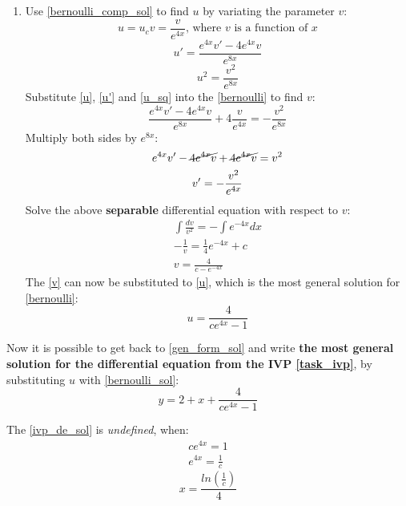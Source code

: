 \documentclass[12pt,a4paper,titlepage]{article}
\begin{document}
\begin{enumerate}
\begin{enumerate}
      \item Use \eqref{bernoulli_comp_sol} to find $u$ by variating the parameter $v$:
      \begin{equation} \label{u}
        u = u_cv = \frac{v}{e^{4x}} \text{, where $v$ is a function of $x$}
      \end{equation}
      \begin{equation} \label{u'}
        u' = \frac{e^{4x}v' - 4e^{4x}v}{e^{8x}}
      \end{equation}
      \begin{equation} \label{u_sq}
        u^2 = \frac{v^2}{e^{8x}}
      \end{equation}
      Substitute \eqref{u}, \eqref{u'} and \eqref{u_sq} into the \eqref{bernoulli} to find $v$:
      \begin{equation*}
        \frac{e^{4x}v' - 4e^{4x}v}{e^{8x}} + 4\frac{v}{e^{4x}} = -\frac{v^2}{e^{8x}}
      \end{equation*}
      Multiply both sides by $e^{8x}$:
      \begin{gather*}
        e^{4x}v' - \cancel{4e^{4x}v} + \cancel{4e^{4x}v} = v^2\\
        v' = -\frac{v^2}{e^{4x}}
      \end{gather*}
      Solve the above \textbf{separable} differential equation with respect to $v$:
      \begin{gather}
        \int \frac{dv}{v^2} = - \int e^{-4x} dx \nonumber \\
        - \frac{1}{v} = \frac{1}{4}e^{-4x} + c \nonumber \\
        v = \frac{4}{c - e^{-4x}} \label{v}
      \end{gather}
      The \eqref{v} can now be substituted to \eqref{u}, which is the most general solution for \eqref{bernoulli}:
      \begin{equation} \label{bernoulli_sol}
        u = \frac{4}{ce^{4x} - 1}
      \end{equation}
    \end{enumerate}

    Now it is possible to get back to \eqref{gen_form_sol} and write \textbf{the most general solution for the differential equation from the IVP \eqref{task_ivp}}, by substituting $u$ with \eqref{bernoulli_sol}:
    \begin{equation} \label{ivp_de_sol}
      y = 2 + x + \frac{4}{ce^{4x} - 1}
    \end{equation}

    The \eqref{ivp_de_sol} is \textit{undefined}, when:
    \begin{gather*}
      ce^{4x} = 1 \\
      e^{4x} = \frac{1}{c}
    \end{gather*}
    \begin{equation} \label{undefined_point}
      x = \frac{ln(\frac{1}{c})}{4}
    \end{equation}


\end{enumerate}
\end{document}
